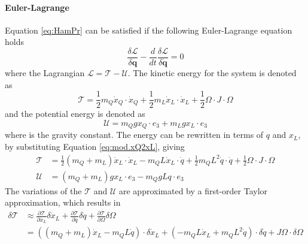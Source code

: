\paragraph{Euler-Lagrange} Equation \ref{eq:HamPr} can be satisfied if the following Euler-Lagrange equation holds
\begin{equation}\label{key}
\frac{\delta \mathcal{L}}{\delta \mathbf{q}}-\frac{d}{dt}\frac{\delta \mathcal{L}}{\delta \dot{\mathbf{q}}}=0
\end{equation}
where the Lagrangian $ \mathcal{L}=\mathcal{T}-\mathcal{U} $.
The kinetic energy for the system is denoted as
\begin{equation}\label{key}
\mathcal{T}=\frac{1}{2}m_Q\dot{x}_Q\cdot\dot{x}_Q+\frac{1}{2}m_L\dot{x}_L\cdot\dot{x}_L+\frac{1}{2}\Omega \cdot J\cdot\Omega
\end{equation}
and the potential energy is denoted as
\begin{equation}\label{key}
\mathcal{U}=m_Qgx_Q\cdot e_3+m_Lgx_L\cdot e_3
\end{equation}
where  is the gravity constant.
The energy can be rewritten in terms of $ q $ and $ x_L $, by substituting Equation \ref{eq:mod.xQ2xL}, giving
\begin{align}\label{key}
\mathcal{T}&=\frac{1}{2}(m_Q+m_L)\dot{x}_L\cdot\dot{x}_L -m_QL\dot{x}_L\cdot\dot{q} + \frac{1}{2}m_QL^2\dot{q}\cdot\dot{q}+\frac{1}{2}\Omega \cdot J\cdot\Omega\\
\mathcal{U}&=(m_Q+m_L)gx_L\cdot e_3-m_QgLq\cdot e_3
\end{align}
The variations of the $ \mathcal{T} $ and $ \mathcal{U} $ are approximated by a first-order Taylor approximation, which results in
\begin{equation}\label{eq:mod.T}
\begin{aligned}
\delta\mathcal{T}&\approx \frac{\partial \mathcal{T}}{\partial\dot{x}_L} \delta\dot{x}_L +\frac{\partial \mathcal{T}}{\partial\dot{q}}\delta\dot{q}+\frac{\partial \mathcal{T}}{\partial\Omega}\delta\Omega\\
&=((m_Q+m_L)\dot{x}_L-m_QL\dot{q})\cdot\delta\dot{x}_L+(-m_QL\dot{x}_L+m_QL^2\dot{q})\cdot\delta\dot{q}+J\Omega\cdot\delta\Omega

\end{aligned}
\end{equation}

